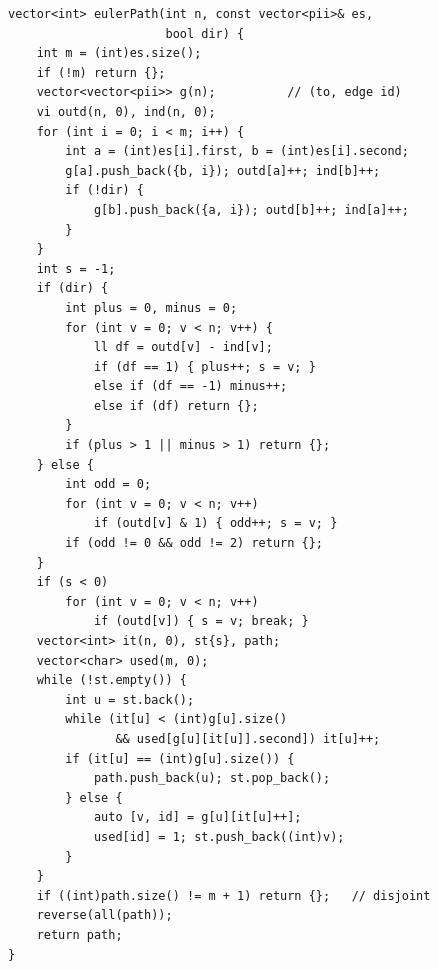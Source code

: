 \begin{lstlisting}
vector<int> eulerPath(int n, const vector<pii>& es,
                      bool dir) {
    int m = (int)es.size();
    if (!m) return {};
    vector<vector<pii>> g(n);          // (to, edge id)
    vi outd(n, 0), ind(n, 0);
    for (int i = 0; i < m; i++) {
        int a = (int)es[i].first, b = (int)es[i].second;
        g[a].push_back({b, i}); outd[a]++; ind[b]++;
        if (!dir) {
            g[b].push_back({a, i}); outd[b]++; ind[a]++;
        }
    }
    int s = -1;
    if (dir) {
        int plus = 0, minus = 0;
        for (int v = 0; v < n; v++) {
            ll df = outd[v] - ind[v];
            if (df == 1) { plus++; s = v; }
            else if (df == -1) minus++;
            else if (df) return {};
        }
        if (plus > 1 || minus > 1) return {};
    } else {
        int odd = 0;
        for (int v = 0; v < n; v++)
            if (outd[v] & 1) { odd++; s = v; }
        if (odd != 0 && odd != 2) return {};
    }
    if (s < 0)
        for (int v = 0; v < n; v++)
            if (outd[v]) { s = v; break; }
    vector<int> it(n, 0), st{s}, path;
    vector<char> used(m, 0);
    while (!st.empty()) {
        int u = st.back();
        while (it[u] < (int)g[u].size()
               && used[g[u][it[u]].second]) it[u]++;
        if (it[u] == (int)g[u].size()) {
            path.push_back(u); st.pop_back();
        } else {
            auto [v, id] = g[u][it[u]++];
            used[id] = 1; st.push_back((int)v);
        }
    }
    if ((int)path.size() != m + 1) return {};   // disjoint
    reverse(all(path));
    return path;
}
\end{lstlisting}


